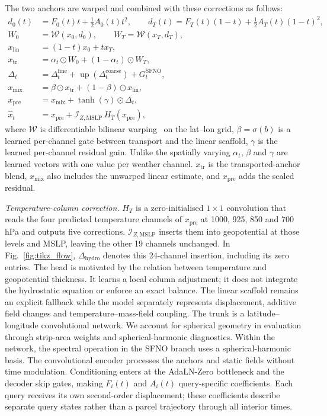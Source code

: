 \documentclass[referee,lineno,pdflatex,sn-nature]{sn-jnl}
\begin{document}
\begin{deferredmethodsintro}
The two anchors are warped and combined with these corrections as follows:
\begin{equation}
\begin{aligned}
d_0(t) &= F_0(t)t+\tfrac12 A_0(t)t^2,\qquad
d_T(t)=F_T(t)(1-t)+\tfrac12 A_T(t)(1-t)^2,\\
W_0 &= \mathcal W(x_0,d_0),\qquad W_T=\mathcal W(x_T,d_T),\\
x_{\mathrm{lin}}&=(1-t)x_0+t x_T,\\
x_{\mathrm{tr}} &= \alpha_t\odot W_0
 +(1-\alpha_t)\odot W_T,\\
\Delta_t &= \Delta_t^{\mathrm{fine}}
 +\operatorname{up}(\Delta_t^{\mathrm{coarse}})+G_t^{\mathrm{SFNO}},\\
x_{\mathrm{mix}} &= \beta\odot x_{\mathrm{tr}}
 +(1-\beta)\odot x_{\mathrm{lin}},\\
x_{\mathrm{pre}} &= x_{\mathrm{mix}}+\tanh(\gamma)\odot\Delta_t,\\
\widehat{x}_t &= x_{\mathrm{pre}}+
\mathcal I_{Z,\mathrm{MSLP}}\,H_T(x_{\mathrm{pre}}),
\end{aligned}
\label{eq:flow_scaffold}
\end{equation}
where $\mathcal{W}$ is differentiable bilinear warping~\cite{jaderberg2015stn} on the
lat--lon grid, $\beta=\sigma(b)$ is a learned per-channel gate between
transport and the linear scaffold, $\gamma$ is the learned per-channel
residual gain. Unlike the spatially varying $\alpha_t$, $\beta$ and
$\gamma$ are learned vectors with one value per weather channel.
$x_{\mathrm{tr}}$ is the transported-anchor blend,
$x_{\mathrm{mix}}$ also includes the unwarped linear estimate, and
$x_{\mathrm{pre}}$ adds the scaled residual.

\emph{Temperature-column correction.}
$H_T$ is a zero-initialised $1\times1$ convolution that reads the four
predicted temperature channels of $x_{\mathrm{pre}}$ at
1000, 925, 850 and 700\,hPa and outputs five corrections.
$\mathcal I_{Z,\mathrm{MSLP}}$ inserts them into geopotential at those
levels and MSLP, leaving the other 19 channels unchanged. In
Fig.~\ref{fig:tikz_flow}, $\Delta_{\mathrm{hydro}}$ denotes this
24-channel insertion, including its zero entries.
The head is motivated by the relation between temperature and geopotential
thickness. It learns a local column adjustment; it does not integrate the
hydrostatic equation or enforce an exact balance.
The linear scaffold remains an explicit fallback while the model
separately represents displacement, additive field changes and
temperature--mass-field coupling.
The trunk is a latitude--longitude convolutional network. We account for spherical geometry in
evaluation through strip-area weights and spherical-harmonic diagnostics.
Within the network, the spectral operation in the SFNO branch uses a
spherical-harmonic basis.
The convolutional encoder processes the anchors and static fields without
time modulation. Conditioning enters at the AdaLN-Zero bottleneck and the
decoder skip gates, making $F_i(t)$ and $A_i(t)$ query-specific coefficients.
Each query receives its own second-order
displacement; these coefficients describe separate query states rather than a
parcel trajectory through all interior times.


\end{deferredmethodsintro}
\end{document}
